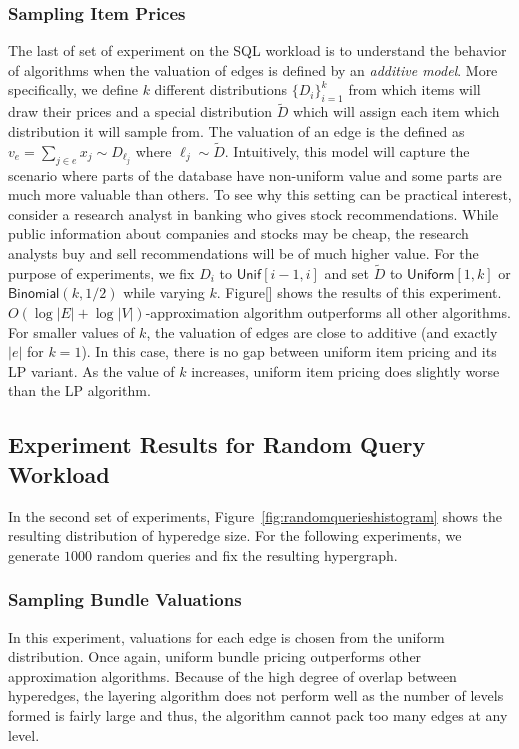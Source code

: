 \subsubsection{Sampling Item Prices} The last of set of experiment on the SQL workload is to understand the behavior of algorithms when the valuation of edges is defined by an \emph{additive model}. More specifically, we define $k$ different distributions $\{D_i\}_{i=1}^{k}$ from which items will draw their prices and a special distribution $\tilde{D}$ which will assign each item which distribution it will sample from. The valuation of an edge is the defined as $v_e = \sum_{j \in e} x_j \sim D_{\ell_j}$ where $\ell_j \sim \tilde{D}$. Intuitively, this model will capture the scenario where parts of the database have non-uniform value and some parts are much more valuable than others. To see why this setting can be practical interest, consider a research analyst in banking who gives stock recommendations. While public information about companies and stocks may be cheap, the research analysts buy and sell recommendations will be of much higher value. For the purpose of experiments, we fix $D_i$ to $\textsf{Unif}[i-1, i]$ and set $\tilde{D}$ to $\textsf{Uniform}[1, k]$ or $\textsf{Binomial}(k, 1/2)$ while varying $k$. Figure[] shows the results of this experiment. $O(\log |E| + \log |V|)$-approximation algorithm outperforms all other algorithms. For smaller values of $k$, the valuation of edges are close to additive (and exactly $|e|$ for $k=1$). In this case, there is no gap between uniform item pricing and its LP variant. As  the value of $k$ increases, uniform item pricing does slightly worse than the LP algorithm.

\subsection{Experiment Results for Random Query Workload}


In the second set of experiments,  Figure~\ref{fig:randomquerieshistogram} shows the resulting distribution of hyperedge size. For the following experiments, we generate $1000$ random queries and fix the resulting hypergraph. 

\subsubsection{Sampling Bundle Valuations}

 In this experiment, valuations for each edge is chosen from the uniform distribution. Once again, uniform bundle pricing outperforms other approximation algorithms. Because of the high degree of overlap between hyperedges, the layering algorithm does not perform well as the number of levels formed is fairly large and thus, the algorithm cannot pack too many edges at any level.
 
